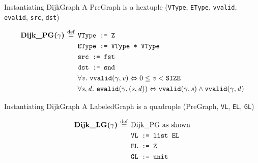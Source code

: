 \documentclass[usenames, xcolor=dvipsnames]{beamer}
\newcommand{\sz}{\texttt{SIZE}}
\newcommand{\defeq}{\mathbin{\overset{\mathrm{def}}{=}}}
\newcommand{\m}[1]{\ensuremath{\mathit{#1}}} %
\newcommand{\bi}{\Leftrightarrow} %
\begin{document}
\begin{frame}{Instantiating DijkGraph}
A PreGraph is a hextuple (\texttt{VType}, \texttt{EType}, \texttt{vvalid}, \texttt{evalid}, \texttt{src}, \texttt{dst})
\vspace{-1.5em}
\begin{flushleft}
\begin{equation*}
\begin{split}
\textbf{Dijk\_PG($\gamma$) $\defeq$ \null} & \texttt{VType := Z} \\
                    &\texttt{EType := VType * VType} \\
                    &\texttt{src := fst} \\
                    &\texttt{dst := snd} \\ 
                    &\forall \m{v}.~\texttt{vvalid}(\gamma, \m{v}) \bi 0 \le \m{v} < {\sz} \\
                    &\forall \m{s,d}.~\texttt{evalid}(\gamma, \m{(s,d)}) \bi \texttt{vvalid}(\gamma, \m{s}) \wedge \texttt{vvalid}(\gamma, \m{d})
\end{split}
\end{equation*}
\end{flushleft}
\end{frame}

\begin{frame}[fragile]{Instantiating DijkGraph}
A LabeledGraph is a quadruple (PreGraph, \texttt{VL}, \texttt{EL}, \texttt{GL})
\vspace{-1.5em}
\begin{flushleft}
\begin{equation*}
\begin{split}
\textbf{Dijk\_LG($\gamma$) $\defeq$ \null} &\text{Dijk\_PG as shown} \\
                  &\texttt{VL := list EL} \\
                  &\texttt{EL := Z} \\
                  &\texttt{GL := unit} 
\end{split}
\end{equation*}
\end{flushleft}
\end{frame}
\end{document}
